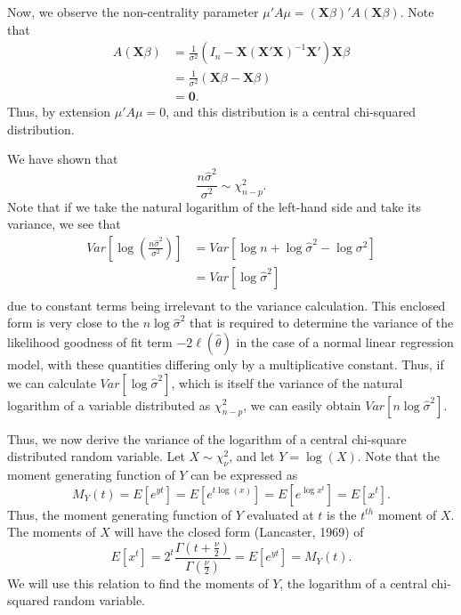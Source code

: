 Now, we observe the non-centrality parameter $\mu 'A \mu = (\mathbf{X} \beta)'A(\mathbf{X} \beta)$. Note that
\begin{equation}
	\begin{split}
	A(\mathbf{X} \beta) & = \frac{1}{\sigma^2} (I_n - \mathbf{X} (\mathbf{X}' \mathbf{X})^{-1} \mathbf{X}')\mathbf{X}\beta  \\ 
	& = \frac{1}{\sigma^2} (\mathbf{X} \beta - \mathbf{X} \beta) \\
	& = \mathbf{0} .
	\end{split}
\end{equation}
Thus, by extension $\mu 'A \mu = 0$, and this distribution is a central chi-squared distribution.

We have shown that
\begin{equation}
	\frac{n \hat{\sigma}^2}{\sigma^2} \sim \chi^2_{n-p} .
\end{equation}
Note that if we take the natural logarithm of the left-hand side and take its variance, we see that
\begin{equation}
	\begin{split}
		Var \left[ \log(\frac{n \hat{\sigma}^2}{\sigma^2}) \right] & = Var \left[ \log n + \log \hat{\sigma}^2 - \log \sigma^2 \right]  \\ 
		& = Var \left[ \log \hat{\sigma}^2 \right] \\
	\end{split}
\end{equation}
due to constant terms being irrelevant to the variance calculation. This enclosed form is very close to the $n \log \hat{\sigma}^2$ that is required
to determine the variance of the likelihood goodness of fit term $-2 \ell (\hat{\theta} )$ in the case of a normal linear regression model, with these
quantities differing only by a multiplicative constant. Thus, if we can calculate $Var \left[ \log \hat{\sigma}^2 \right]$, which is itself the variance
of the natural logarithm of a variable distributed as $\chi^2_{n-p}$, we can easily obtain $Var \left[ n \log \hat{\sigma}^2 \right]$.

Thus, we now derive the variance of the logarithm of a central chi-square distributed random variable. Let $X \sim \chi^2_{\nu}$, and let $Y = \log(X)$. Note that
the moment generating function of $Y$ can be expressed as
\begin{equation}
	M_Y (t) = E \left[ e^{yt} \right] = E \left[ e^{t\log(x)} \right] = E \left[ e^{\log x^t} \right] = E \left[ x^t \right] .
\end{equation}
Thus, the moment generating function of $Y$ evaluated at $t$ is the $t^{th}$ moment of $X$. The moments of $X$ will have the
closed form (Lancaster, 1969) of
\begin{equation}
	E \left[ x^t \right] = 2^t \frac{\Gamma (t + \frac{\nu}{2})}{\Gamma (\frac{\nu}{2})} = E \left[ e^{yt} \right] = M_Y (t) .
\end{equation}
We will use this relation to find the moments of $Y$, the logarithm of a central chi-squared random variable.

